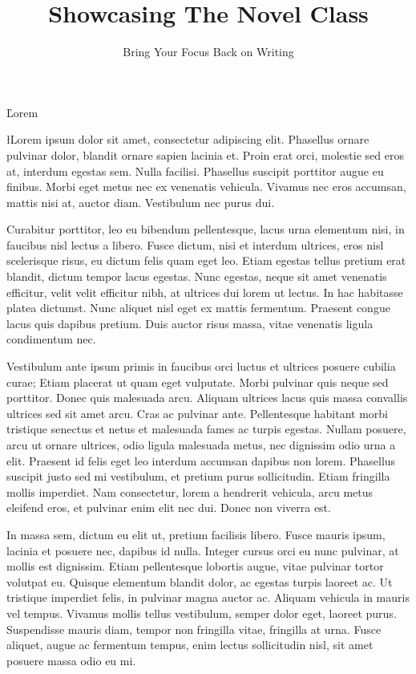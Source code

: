 \documentclass{novel}
\title{Showcasing The Novel Class}
\subtitle{Bring Your Focus Back on Writing}
\begin{document}
\toc

\h{Lorem}

\l{L}orem ipsum dolor sit amet, consectetur adipiscing elit. Phasellus ornare pulvinar dolor, blandit ornare sapien lacinia et. Proin erat orci, molestie sed eros at, interdum egestas sem. Nulla facilisi. Phasellus suscipit porttitor augue eu finibus. Morbi eget metus nec ex venenatis vehicula. Vivamus nec eros accumsan, mattis nisi at, auctor diam. Vestibulum nec purus dui.

Curabitur porttitor, leo eu bibendum pellentesque, lacus urna elementum nisi, in faucibus nisl lectus a libero. Fusce dictum, nisi et interdum ultrices, eros nisl scelerisque risus, eu dictum felis quam eget leo. Etiam egestas tellus pretium erat blandit, dictum tempor lacus egestas. Nunc egestas, neque sit amet venenatis efficitur, velit velit efficitur nibh, at ultrices dui lorem ut lectus. In hac habitasse platea dictumst. Nunc aliquet nisl eget ex mattis fermentum. Praesent congue lacus quis dapibus pretium. Duis auctor risus massa, vitae venenatis ligula condimentum nec.

Vestibulum ante ipsum primis in faucibus orci luctus et ultrices posuere cubilia curae; Etiam placerat ut quam eget vulputate. Morbi pulvinar quis neque sed porttitor. Donec quis malesuada arcu. Aliquam ultrices lacus quis massa convallis ultrices sed sit amet arcu. Cras ac pulvinar ante. Pellentesque habitant morbi tristique senectus et netus et malesuada fames ac turpis egestas. Nullam posuere, arcu ut ornare ultrices, odio ligula malesuada metus, nec dignissim odio urna a elit. Praesent id felis eget leo interdum accumsan dapibus non lorem. Phasellus suscipit justo sed mi vestibulum, et pretium purus sollicitudin. Etiam fringilla mollis imperdiet. Nam consectetur, lorem a hendrerit vehicula, arcu metus eleifend eros, et pulvinar enim elit nec dui. Donec non viverra est.

In massa sem, dictum eu elit ut, pretium facilisis libero. Fusce mauris ipsum, lacinia et posuere nec, dapibus id nulla. Integer cursus orci eu nunc pulvinar, at mollis est dignissim. Etiam pellentesque lobortis augue, vitae pulvinar tortor volutpat eu. Quisque elementum blandit dolor, ac egestas turpis laoreet ac. Ut tristique imperdiet felis, in pulvinar magna auctor ac. Aliquam vehicula in mauris vel tempus. Vivamus mollis tellus vestibulum, semper dolor eget, laoreet purus. Suspendisse mauris diam, tempor non fringilla vitae, fringilla at urna. Fusce aliquet, augue ac fermentum tempus, enim lectus sollicitudin nisl, sit amet posuere massa odio eu mi.
\end{document}
